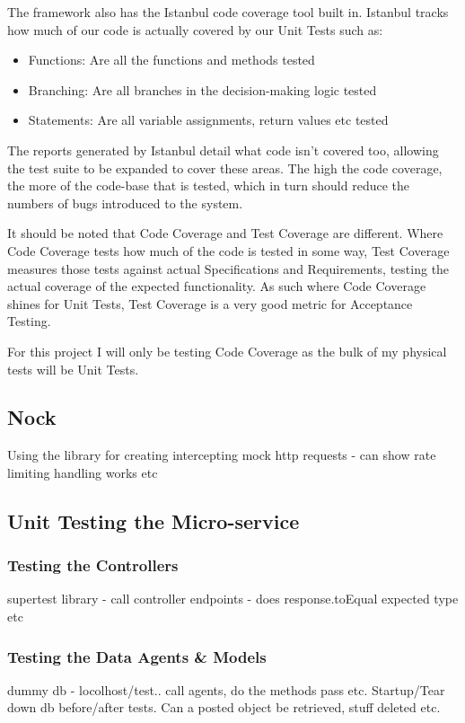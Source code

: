 The framework also has the Istanbul code coverage tool built in. Istanbul tracks how much of our code is actually covered by our Unit Tests such as:
\begin{itemize}
    \item Functions: Are all the functions and methods tested
    \item Branching: Are all branches in the decision-making logic tested
    \item Statements: Are all variable assignments, return values etc tested
\end{itemize}

The reports generated by Istanbul detail what code isn't covered too, allowing the test suite to be expanded to cover these areas. The high the code coverage, the more of the code-base that is tested, which in turn should reduce the numbers of bugs introduced to the system.

It should be noted that Code Coverage and Test Coverage are different. Where Code Coverage tests how much of the code is tested in some way, Test Coverage measures those tests against actual Specifications and Requirements, testing the actual coverage of the expected functionality. As such where Code Coverage shines for Unit Tests, Test Coverage is a very good metric for Acceptance Testing.

For this project I will only be testing Code Coverage as the bulk of my physical tests will be Unit Tests.
\subsection{Nock}
Using the library for creating intercepting mock http requests - can show rate limiting handling works etc
\subsection{Unit Testing the Micro-service}
\subsubsection{Testing the Controllers}
supertest library - call controller endpoints - does response.toEqual expected type etc
\subsubsection{Testing the Data Agents \& Models}
dummy db - locolhost/test.. call agents, do the methods pass etc. Startup/Tear down db before/after tests. Can a posted object be retrieved, stuff deleted etc. 
